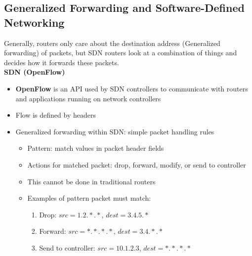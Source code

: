 \documentclass{article}
\begin{document}
\subsection{Generalized Forwarding and Software-Defined Networking}
Generally, routers only care about the destination address (Generalized forwarding) of packets,
but SDN routers look at a combination of things and decides how it forwards these packets. \\
\textbf{SDN (OpenFlow)}
\begin{itemize}
    \item \textbf{OpenFlow} is an API used by SDN controllers to communicate with routers and applications
    running on network controllers
    \item Flow is defined by headers
    \item Generalized forwarding within SDN: simple packet handling rules
    \begin{itemize}
        \item Pattern: match values in packet header fields
        \item Actions for matched packet: drop, forward, modify, or send to controller
        \item This cannot be done in traditional routers
        \item Examples of pattern packet must match:
        \begin{enumerate}
            \item Drop: $src=1.2.*.*$, $dest=3.4.5.*$
            \item Forward: $src=*.*.*.*$, $dest=3.4.*.*$
            \item Send to controller: $src=10.1.2.3$, $dest=*.*.*.*$
        \end{enumerate}
    \end{itemize}
\end{itemize}
\newpage

\end{document}
